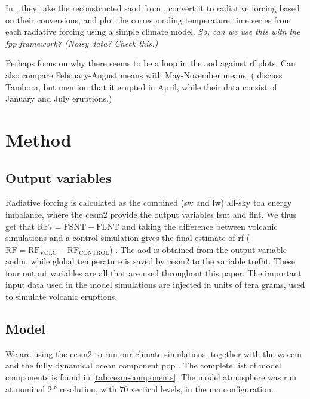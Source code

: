 \documentclass[twocol]{ametsocV5}
\newcommand{\iso}[1][i]{{#1}njected \ce{SO2}}
\begin{document}
In \citet{marshall2020}, they take the reconstructed \acrshort{saod} from
\citet{toohey2017}, convert it to radiative forcing based on their conversions, and plot
the corresponding temperature time series from each radiative forcing using a simple
climate model. \emph{So, can we use this with the \acrfull{fpp} framework? (Noisy data?
  Check this.)}

Perhaps focus on why there seems to be a loop in the \acrshort{aod} against
\acrshort{rf} plots. Can also compare February-August means with May-November means.
(\citet{marshall2021} discuss Tambora, but mention that it erupted in April, while their
data consist of January and July eruptions.)

\section{Method}

\subsection{Output variables}


Radiative forcing is calculated as the combined (\acrshort{sw} and \acrshort{lw})
all-sky \acrshort{toa} energy imbalance, where the \acrshort{cesm2} provide the output
variables \acrfull{fsnt} and \acrfull{flnt}. We thus get that \(\mathrm{RF_*}=
\mathrm{FSNT} - \mathrm{FLNT}\) and taking the difference between volcanic simulations
and a control simulation gives the final estimate of \acrshort{rf}
(\(\mathrm{RF}=\mathrm{RF_{VOLC}}-\mathrm{RF_{CONTROL}}\)) \citep{marshall2020}. The
\acrshort{aod} is obtained from the output variable \acrfull{aodm}, while global
temperature is saved by \acrshort{cesm2} to the variable \acrfull{trefht}. These four
output variables are all that are used throughout this paper. The important input data
used in the model simulations are \iso{} in units of tera grams, used to simulate
volcanic eruptions.

\subsection{Model}

We are using the \acrfull{cesm2} \citep{danabasoglu2020} to run our climate simulations,
together with the \acrfull{waccm} \citep{gettleman2019} and the fully dynamical ocean
component \acrfull{pop} \citep{smith2010, danabasoglu2020}. The complete list of model
components is found in \cref{tab:cesm-components}. The model atmosphere was run at
nominal \(\SI{2}{\degree}\) resolution, with \(70\) vertical levels, in the \acrfull{ma}
configuration.
\end{document}
